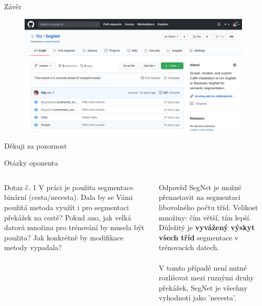 \documentclass[aspectratio=1610]{beamer}
\begin{document}
\begin{frame}{Závěr}
\begin{figure}[h]
	\begin{center}
		\includegraphics[width=15cm, keepaspectratio]{github.png}
	\end{center}	 	
\end{figure}
\end{frame}
\begin{frame}{}
	\centering
	{\Large Děkuji za pozornost}	
\end{frame}
\begin{frame}{Otázky oponenta}
\begin{columns}
\begin{exampleblock}{Dotaz č. 1}
V práci je použita segmentace binární (cesta/necesta). Dala by se Vámi použitá metoda využít i pro segmentaci překážek na cestě? Pokud ano, jak velká datová množina pro trénování by musela být použita? Jak konkrétně by modifikace metody vypadala?
\end{exampleblock}

\begin{block}{Odpověď}
SegNet je možné přenastavit na segmentaci libovolného počtu tříd. Velikost množiny: čím větší, tím lepší. Důležitý je \textbf{vyvážený výskyt všech tříd} segmentace v trénovacích datech. \\~\\

V tomto případě není nutné rozlišovat mezi ruznými druhy překážek, SegNet je všechny vyhodnotí jako 'necesta'.
\end{block}
\end{columns}
\end{frame}
\end{document}
